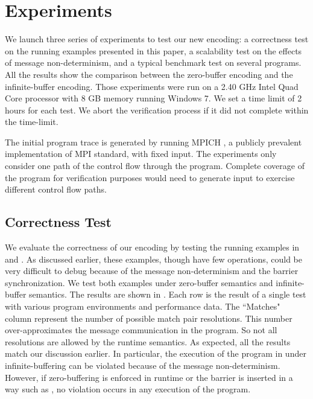 \section{Experiments}
We launch three series of experiments to test our new encoding: a correctness test on the running examples presented in this paper, a scalability test on the effects of message non-determinism, and a typical benchmark test on several programs. All the results show the comparison between the zero-buffer encoding and the infinite-buffer encoding.  Those experiments were run on a 2.40 GHz Intel Quad Core processor with 8 GB memory running Windows 7. We set a time limit of 2 hours for each test. We abort the verification process if it did not complete within the time-limit. 

The initial program trace is generated by running MPICH \cite{}, a publicly prevalent implementation of MPI standard, with fixed input. The experiments only consider one path of the control flow through the program. Complete coverage of the program for verification purposes would need to generate input to exercise different control flow paths. 

\subsection{Correctness Test}
We evaluate the correctness of our encoding by testing the running examples in  and . As discussed earlier, these examples, though have few operations, could be very difficult to debug because of the message non-determinism and the barrier synchronization. We test both examples under zero-buffer semantics and infinite-buffer semantics. The results are shown in . Each row is the result of a single test with various program environments and performance data. The ``Matches" column represent the number of possible match pair resolutions.  This number over-approximates the message communication in the program. So not all resolutions are allowed by the runtime semantics. As expected, all the results match our discussion earlier. In particular, the execution of the program in  under infinite-buffering can be violated because of the message non-determinism. However, if zero-buffering is enforced in runtime or the barrier is inserted in a way such as , no violation occurs in any execution of the program. 

